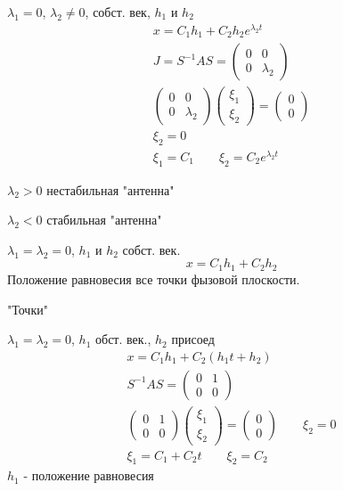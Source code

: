 \documentclass{article}
\begin{document}
\hr 
$\lambda_1=0$, $\lambda_2 \neq 0$, собст. век, $h_1$ и $h_2$
\begin{gather*}
  x=C_1h_1+C_2h_2e^{\lambda_2 t} \\ 
  J = S^{-1}AS = \begin{pmatrix}
    0 & 0 \\ 
    0 & \lambda_2
  \end{pmatrix} \\ 
  \begin{pmatrix}
    0 & 0 \\ 
    0 & \lambda_2
  \end{pmatrix} \begin{pmatrix}
    \xi_1 \\ 
    \xi_2
  \end{pmatrix} = \begin{pmatrix}
    0 \\ 0
  \end{pmatrix} \\
  \xi_2 = 0 \\ 
  \xi_1=C_1 \qquad \xi_2=C_2e^{\lambda_2 t}
\end{gather*}


$\lambda_2 > 0$ нестабильная "антенна"

$\lambda_2 < 0$ стабильная "антенна"

\hr 
$\lambda_1=\lambda_2=0$, $h_1$ и $h_2$ собст. век.
\[
  x=C_1h_1 + C_2h_2
\]
Положение равновесия все точки фызовой плоскости.

"Точки"

\hr 
$\lambda_1=\lambda_2=0$, $h_1$ обст. век., $h_2$ присоед
\begin{gather*}
  x=C_1h_1+C_2(h_1t+h_2) \\ 
  S^{-1}AS=\begin{pmatrix}
    0 & 1 \\ 
    0 & 0 
  \end{pmatrix} \\ 
  \begin{pmatrix}
    0 & 1 \\ 
    0 & 0 
  \end{pmatrix}\begin{pmatrix}
    \xi_1 \\ 
    \xi_2
  \end{pmatrix} = \begin{pmatrix}
    0 \\ 0
  \end{pmatrix} \qquad \xi_2=0 \\ 
  \xi_1=C_1+C_2t \qquad \xi_2=C_2
\end{gather*}
$h_1$ - положение равновесия
\end{document}
